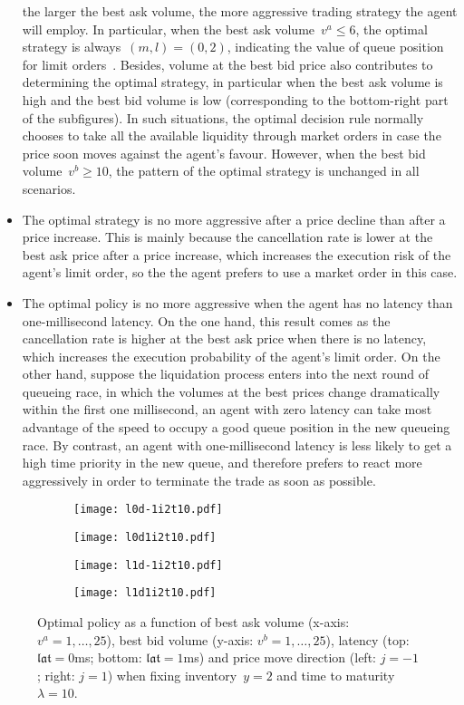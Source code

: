 \documentclass{amsart}[11pt]
\numberwithin{equation}{section}
\theoremstyle{definition}
\begin{document}
\begin{itemize}
the larger the best ask volume, the more aggressive trading strategy the agent will employ. 
In particular, when the best ask volume~$v^a \leq 6$, 
the optimal strategy is always~$(m , l) = (0, 2)$,
indicating the value of queue position for limit orders~\cite{moallemi2016model}.
Besides, volume at the best bid price also contributes to determining the optimal strategy, 
in particular when the best ask volume is high and the best bid volume is low 
(corresponding to the bottom-right part of the subfigures).
In such situations, the optimal decision rule normally chooses to take all the available liquidity through market orders in case the price soon moves against the agent's favour.
However, when the best bid volume~$v^b\geq 10$, 
the pattern of the optimal strategy is unchanged in all scenarios.
\item 
The optimal strategy is no more aggressive after a price decline than after a price increase.
This is mainly because the cancellation rate is lower at the best ask price after a price increase, 
which increases the execution risk of the agent's limit order, so the the agent prefers to use a market order in this case.
\item 
The optimal policy is no more aggressive when the agent has no latency than one-millisecond latency. 
On the one hand, 
this result comes as the cancellation rate is higher at the best ask price when there is no latency,
which increases the execution probability of the agent's limit order.
On the other hand, 
suppose the liquidation process enters into the next round of queueing race, 
in which the volumes at the best prices change dramatically within the first one millisecond,
an agent with zero latency can take most advantage of the speed to occupy a good queue position in the new queueing race.
By contrast, an agent with one-millisecond latency is less likely to get a high time priority in the new queue,
and therefore prefers to react more aggressively in order  to terminate the trade as soon as possible.
\end{itemize}

\begin{figure}[!htp]
\centering
	\begin{subfigure}
	\centering
	\texttt{[image: l0d-1i2t10.pdf]}
	\end{subfigure}
	\begin{subfigure}
	\centering
	\texttt{[image: l0d1i2t10.pdf]}
	\end{subfigure}
	\begin{subfigure}
	\centering
	\texttt{[image: l1d-1i2t10.pdf]}
	\end{subfigure}
	\begin{subfigure}
	\centering
	\texttt{[image: l1d1i2t10.pdf]}
	\end{subfigure}
\caption{Optimal policy as a function of best ask volume (x-axis: $v^a = 1, \dots, 25$),
best bid volume (y-axis: $v^b = 1, \dots, 25$), 
latency (top: $\mathfrak{lat} = 0$ms; bottom: $\mathfrak{lat} = 1$ms) 
and price move direction (left: $j = -1$; right: $j = 1$) when
fixing inventory~$y = 2$ and time to maturity~$\lambda = 10$.}
\label{Fig:OS0lct}
\end{figure}
\end{document}

